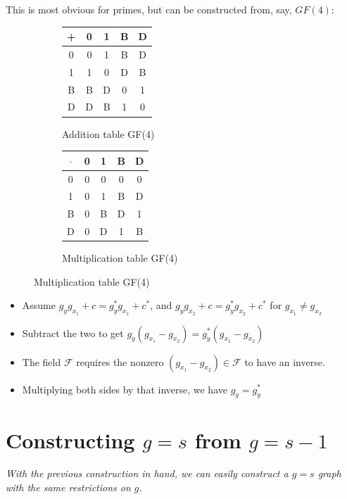 \documentclass[11pt, oneside]{article} 	%
\begin{document}
This is most obvious for primes, but can be constructed from, say, $GF(4):$

\begin{figure}[!htb]
\centering
\begin{subfigure}{.5\textwidth}
 \centering
 \begin{tabular}{c | c c c c}
     + & 0 & 1 & B & D \\
\hline
     0 & 0 & 1 & B & D \\
     1 & 1 & 0 & D & B \\
     B & B & D & 0 & 1 \\
     D & D & B & 1  & 0 \\
     \end{tabular}
 \caption{Addition table GF(4)}
\label{fig:gf-add}
\end{subfigure}
\begin{subfigure}{.5\textwidth}
 \centering
\begin{tabular}{c | c c c c}
     $\cdot$ & 0 & 1 & B & D \\
\hline
     0 & 0 & 0 & 0 & 0 \\
     1 & 0 & 1 & B & D \\
     B & 0 & B & D & 1 \\
     D & 0 & D & 1 & B \\
\end{tabular}
 \caption{Multiplication table GF(4)}
\label{fig:gf-mult}
\end{subfigure}
\end{figure}



\begin{itemize}
\item Assume $g_yg_{x_1} + c = g_y^*g_{x_1} +c^*$, and $g_yg_{x_2} + c = g_y^*g_{x_2} +c^*$ for $g_{x_1} \neq g_{x_2}$
\item Subtract the two to get $g_y(g_{x_1} - g_{x_2}) = g_y^*(g_{x_1} - g_{x_2})$
\item The field $\mathcal{F}$ requires the nonzero $(g_{x_1} - g_{x_2}) \in \mathcal{F}$ to have an inverse.  
\item Multiplying both sides by that inverse, we have $g_y = g_y^*$
\end{itemize}



\section{Constructing $g=s$ from $g=s-1$}
\emph{With the previous construction in hand, we can easily construct a $g=s$ graph with the same restrictions on $g$.}
\end{document}
